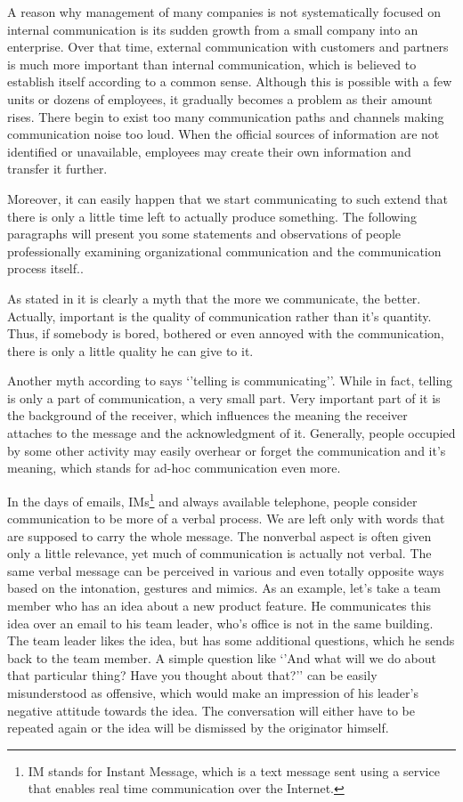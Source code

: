 \documentclass[11pt,singleside]{myfithesis2}
\begin{document}
A reason why management of many companies is not systematically focused on internal communication is its sudden growth from a small company into an enterprise. Over that time, external communication with customers and partners is much more important than internal communication, which is believed to establish itself according to a common sense. Although this is possible with a few units or dozens of employees, it gradually becomes a problem as their amount rises. There begin to exist too many communication paths and channels making communication noise too loud. When the official sources of information are not identified or unavailable, employees may create their own information and transfer it further.

Moreover, it can easily happen that we start communicating to such extend that there is only a little time left to actually produce something. The following paragraphs will present you some statements and observations of people professionally examining organizational communication and the communication process itself..

As stated in \cite{orgCommForSurvival} it is clearly a myth that the more we communicate, the better. Actually, important is the quality of communication rather than it's quantity. Thus, if somebody is bored, bothered or even annoyed with the communication, there is only a little quality he can give to it.

Another myth according to \cite{orgCommForSurvival} says `'telling is communicating''. While in fact, telling is only a part of communication, a very small part. Very important part of it is the background of the receiver, which influences the meaning the receiver attaches to the message and the acknowledgment of it. Generally, people occupied by some other activity may easily overhear or forget the communication and it's meaning, which stands for ad-hoc communication even more.

In the days of emails, IMs\footnote{IM stands for Instant Message, which is a text message sent using a service that enables real time communication over the Internet.} and always available telephone, people consider communication to be more of a verbal process. We are left only with words that are supposed to carry the whole message. The nonverbal aspect is often given only a little relevance, yet much of communication is actually not verbal. The same verbal message can be perceived in various and even totally opposite ways based on the intonation, gestures and mimics. As an example, let's take a team member who has an idea about a new product feature. He communicates this idea over an email to his team leader, who's office is not in the same building. The team leader likes the idea, but has some additional questions, which he sends back to the team member. A simple question like `'And what will we do about that particular thing? Have you thought about that?'' can be easily misunderstood as offensive, which would make an impression of his leader's negative attitude towards the idea. The conversation will either have to be repeated again or the idea will be dismissed by the originator himself.
\end{document}
